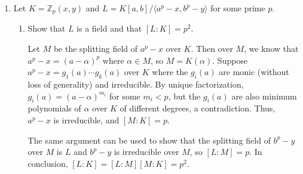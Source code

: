 \documentclass[12pt]{article}
\newcommand{\ZZ}{\mathbb{Z}}
\begin{document}
\begin{enumerate}
    \item Let $K = \ZZ_p(x,y)$ and $L = K[a,b]/\langle a^p - x, b^p - y\rangle$ for some prime $p$. \par
    \begin{enumerate}
        \item Show that $L$ is a field and that $[L:K] = p^2$. \par
            \iffalse
                We know that $L$ is a field if and only if $a^p - x$ and $b^p - y$ are irreducible, which is true because they are by definition the minimal polynomials of the newly adjoined elements which will be denoted $\sqrt[p]{x}$ and $\sqrt[p]{y}$. Thus, $[L : K] = [L : K[a] / (\langle a^p - x \rangle)] [(K[a] / \langle a^p - x \rangle) : K] = p^2$.
            \fi
            Let $M$ be the splitting field of $a^p - x$ over $K$. Then over $M$, we know that $a^p - x = (a - \alpha)^p$ where $\alpha \in M$, so $M = K(\alpha)$. Suppose $a^p - x = g_1(a) \cdots g_k(a)$ over $K$ where the $g_i(a)$ are monic (without loss of generality) and irreducible. By unique factorization, $g_i(a) = (a - \alpha)^{m_i}$ for some $m_i < p$, but the $g_i(a)$ are also minimum polynomials of $\alpha$ over $K$ of different degrees, a contradiction. Thus, $a^p - x$ is irreducible, and $[M : K] = p$. \par
            The same argument can be used to show that the splitting field of $b^p - y$ over $M$ is $L$ and $b^p - y$ is irreducible over $M$, so $[L : M] = p$. In conclusion, $[L : K] = [L : M][M : K] = p^2$.


\end{enumerate}
\end{enumerate}
\end{document}
